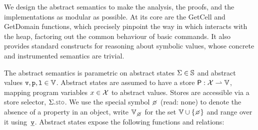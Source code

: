 %
 We design the abstract semantics to make the analysis, the proofs, and the implementations as modular as possible. At its core are the GetCell and GetDomain functions, which precisely pinpoint the way in which \jsil interacts with the heap, factoring out the common behaviour of \jsil basic commands. It also provides standard constructs for reasoning about symbolic values, whose concrete and instrumented semantics are trivial.

The abstract semantics is parametric on abstract states $\Sigma \in \mathbb{S}$ and abstract values $\mathtt{v}, \mathtt{p}, \mathtt{l} \in \mathbb{V}$. 
%
Abstract states are assumed to have a store ${\sf P}: \mathcal{X} \rightharpoonup \mathbb{V}$, mapping program variables $x \in \mathcal{X}$ to abstract values. Stores are accessible via a store selector, $\absstate.\stosel$.
We use the special symbol $\none$ (read: none) to denote the absence of a property in an object, write $\setext{\absvals}{\none}$ for the set $\absvals \cup \{ \none \}$ and range over it using~$\underline{\mathtt{v}}$.
Abstract states expose the following functions and relations: 
